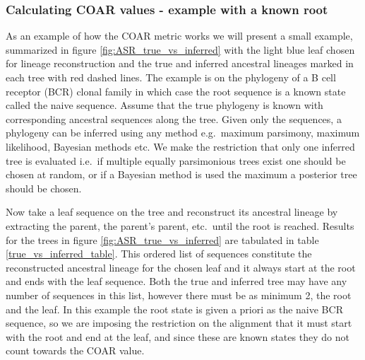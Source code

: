 \subsubsection{Calculating COAR values - example with a known root}
As an example of how the COAR metric works we will present a small example, summarized in figure \ref{fig:ASR_true_vs_inferred} with the light blue leaf chosen for lineage reconstruction and the true and inferred ancestral lineages marked in each tree with red dashed lines.
The example is on the phylogeny of a B cell receptor (BCR) clonal family in which case the root sequence is a known state called the naive sequence.
Assume that the true phylogeny is known with corresponding ancestral sequences along the tree.
Given only the sequences, a phylogeny can be inferred using any method e.g.\ maximum parsimony, maximum likelihood, Bayesian methods etc.
We make the restriction that only one inferred tree is evaluated i.e.\ if multiple equally parsimonious trees exist one should be chosen at random, or if a Bayesian method is used the maximum a posterior tree should be chosen.

Now take a leaf sequence on the tree and reconstruct its ancestral lineage by extracting the parent, the parent's parent, etc.\ until the root is reached.
Results for the trees in figure \ref{fig:ASR_true_vs_inferred} are tabulated in table \ref{true_vs_inferred_table}.
This ordered list of sequences constitute the reconstructed ancestral lineage for the chosen leaf and it always start at the root and ends with the leaf sequence.
Both the true and inferred tree may have any number of sequences in this list, however there must be as minimum 2, the root and the leaf.
In this example the root state is given a priori as the naive BCR sequence, so we are imposing the restriction on the alignment that it must start with the root and end at the leaf, and since these are known states they do not count towards the COAR value.

